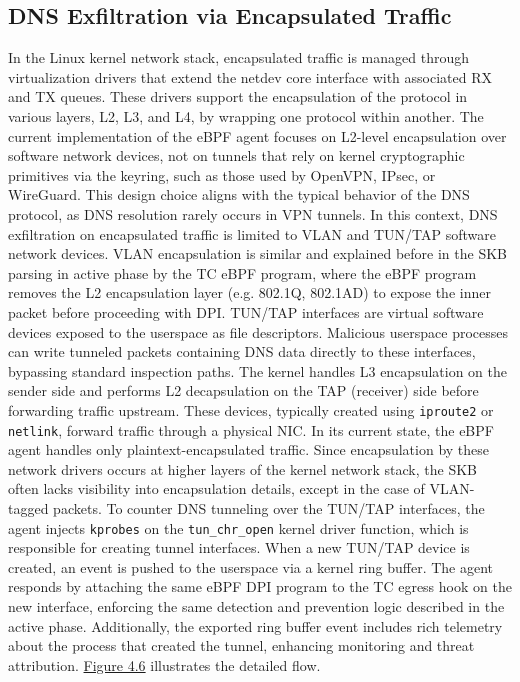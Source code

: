 \documentclass [11pt, proquest] {uwthesis}[2020/02/24]
\begin{document}
\subsection{DNS Exfiltration via Encapsulated Traffic}
\label{sec:encap}
In the Linux kernel network stack, encapsulated traffic is managed through virtualization drivers that extend the netdev core interface with associated RX and TX queues. These drivers support the encapsulation of the protocol in various layers, L2, L3, and L4, by wrapping one protocol within another. 
The current implementation of the eBPF agent focuses on L2-level encapsulation over software network devices, not on tunnels that rely on kernel cryptographic primitives via the keyring, such as those used by OpenVPN, IPsec, or WireGuard. This design choice aligns with the typical behavior of the DNS protocol, as DNS resolution rarely occurs in VPN tunnels. In this context, DNS exfiltration on encapsulated traffic is limited to VLAN and TUN/TAP software network devices. VLAN encapsulation is similar and explained before in the SKB parsing in active phase by the TC eBPF program, where the eBPF program removes the L2 encapsulation layer (e.g. 802.1Q, 802.1AD) to expose the inner packet before proceeding with DPI.
TUN/TAP interfaces are virtual software devices exposed to the userspace as file descriptors. Malicious userspace processes can write tunneled packets containing DNS data directly to these interfaces, bypassing standard inspection paths. The kernel handles L3 encapsulation on the sender side and performs L2 decapsulation on the TAP (receiver) side before forwarding traffic upstream. These devices, typically created using \texttt{iproute2} or \texttt{netlink}, forward traffic through a physical NIC. In its current state, the eBPF agent handles only plaintext-encapsulated traffic. Since encapsulation by these network drivers occurs at higher layers of the kernel network stack, the SKB often lacks visibility into encapsulation details, except in the case of VLAN-tagged packets. To counter DNS tunneling over the TUN/TAP interfaces, the agent injects \texttt{kprobes} on the \texttt{tun\_chr\_open} kernel driver function, which is responsible for creating tunnel interfaces. When a new TUN/TAP device is created, an event is pushed to the userspace via a kernel ring buffer. The agent responds by attaching the same eBPF DPI program to the TC egress hook on the new interface, enforcing the same detection and prevention logic described in the active phase. 
Additionally, the exported ring buffer event includes rich telemetry about the process that created the tunnel, enhancing monitoring and threat attribution. \hyperref[sec:data_plane_tunnel_netdev]{Figure 4.6} illustrates the detailed flow.
\end{document}
